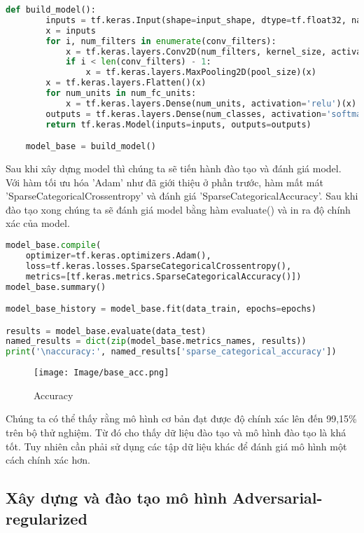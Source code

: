 \begin{lstlisting}[language=Python]
    def build_model():
        inputs = tf.keras.Input(shape=input_shape, dtype=tf.float32, name='image')
        x = inputs
        for i, num_filters in enumerate(conv_filters):
            x = tf.keras.layers.Conv2D(num_filters, kernel_size, activation='relu')(x)
            if i < len(conv_filters) - 1:
                x = tf.keras.layers.MaxPooling2D(pool_size)(x)
        x = tf.keras.layers.Flatten()(x)
        for num_units in num_fc_units:
            x = tf.keras.layers.Dense(num_units, activation='relu')(x)
        outputs = tf.keras.layers.Dense(num_classes, activation='softmax')(x)
        return tf.keras.Model(inputs=inputs, outputs=outputs)

    model_base = build_model()
\end{lstlisting}

Sau khi xây dựng model thì chúng ta sẽ tiến hành đào tạo và đánh giá model. Với hàm tối ưu hóa 'Adam' như đã giới thiệu ở phần trước, hàm mất mát 'SparseCategoricalCrossentropy'
và đánh giá 'SparseCategoricalAccuracy'. Sau khi đào tạo xong chúng ta sẽ đánh giá model bằng hàm evaluate() và in ra độ chính xác của model.

\begin{lstlisting}[language=Python]
model_base.compile(
    optimizer=tf.keras.optimizers.Adam(),
    loss=tf.keras.losses.SparseCategoricalCrossentropy(),
    metrics=[tf.keras.metrics.SparseCategoricalAccuracy()])
model_base.summary()

model_base_history = model_base.fit(data_train, epochs=epochs)

results = model_base.evaluate(data_test)
named_results = dict(zip(model_base.metrics_names, results))
print('\naccuracy:', named_results['sparse_categorical_accuracy'])

\end{lstlisting}

\begin{figure}[ht]
\centering
\texttt{[image: Image/base\_acc.png]}
\caption{Accuracy}
\label{fig3.1:Độ chính xác của mô hình cơ bản}
\end{figure}

Chúng ta có thể thấy rằng mô hình cơ bản đạt được độ chính xác lên đến 99,15\% trên bộ thử nghiệm. Từ đó cho thấy dữ liệu đào tạo và 
mô hình đào tạo là khá tốt. Tuy nhiên cần phải sử dụng các tập dữ liệu khác để đánh giá mô hình một cách chính xác hơn.

\subsection{Xây dựng và đào tạo mô hình Adversarial-regularized }

